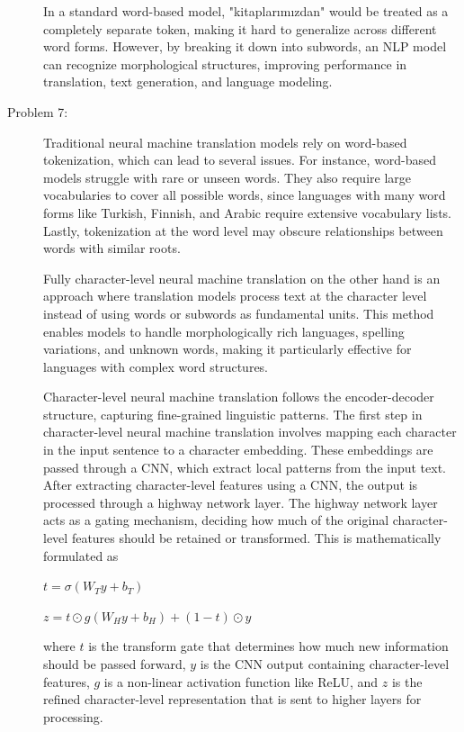 \documentclass[10pt]{article}
\begin{document}
\begin{description}
In a standard word-based model, "kitaplarımızdan" would be treated as a completely separate token, making it hard to generalize across different word forms. 
However, by breaking it down into subwords, an NLP model can recognize morphological structures, improving performance in translation, text generation, and language modeling.

\pagebreak

\item[Problem 7:]  \hfill %

Traditional neural machine translation models rely on word-based tokenization, which can lead to several issues. 
For instance, word-based models struggle with rare or unseen words. They also require large vocabularies to cover all possible words, 
since languages with many word forms like Turkish, Finnish, and Arabic require extensive vocabulary lists.
Lastly, tokenization at the word level may obscure relationships between words with similar roots.

Fully character-level neural machine translation on the other hand is an approach where translation models process text at the character level instead of using 
words or subwords as fundamental units. This method enables models to handle morphologically rich languages, spelling variations, and unknown words, making it 
particularly effective for languages with complex word structures.

Character-level neural machine translation follows the encoder-decoder structure, capturing fine-grained linguistic patterns.
The first step in character-level neural machine translation involves mapping each character in the input sentence to a character embedding.
These embeddings are passed through a CNN, which extract local patterns from the input text.
After extracting character-level features using a CNN, the output is processed through a highway network layer.
The highway network layer acts as a gating mechanism, deciding how much of the original character-level features should be retained or transformed.
This is mathematically formulated as 

\begin{center}
    $t = \sigma(W_T y + b_T)$

    $z = t \odot g(W_H y + b_H) + (1 - t) \odot y$
\end{center}

where $t$ is the transform gate that determines how much new information should be passed forward,
$y$ is the CNN output containing character-level features, $g$ is a non-linear activation function like ReLU,
and $z$ is the refined character-level representation that is sent to higher layers for processing.


\end{description}
\end{document}
